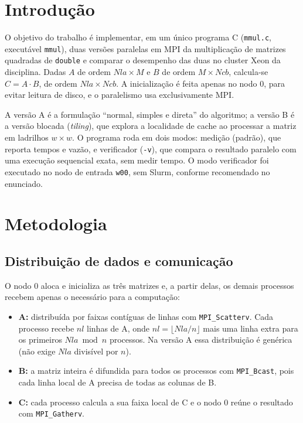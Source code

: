 \documentclass[conference]{IEEEtran}
\begin{document}
\section{Introdução}

O objetivo do trabalho é implementar, em um único programa C (\texttt{mmul.c},
executável \texttt{mmul}), duas versões paralelas em MPI da multiplicação de
matrizes quadradas de \texttt{double} e comparar o desempenho das duas no
cluster Xeon da disciplina. Dadas $A$ de ordem $Nla \times M$ e $B$ de ordem
$M \times Ncb$, calcula-se $C = A \cdot B$, de ordem $Nla \times Ncb$. A
inicialização é feita apenas no nodo 0, para evitar leitura de disco, e o
paralelismo usa exclusivamente MPI.

A versão A é a formulação ``normal, simples e direta'' do algoritmo; a versão
B é a versão blocada (\emph{tiling}), que explora a localidade de cache ao
processar a matriz em ladrilhos $w \times w$. O programa roda em dois modos:
medição (padrão), que reporta tempos e vazão, e verificador (\texttt{-v}), que
compara o resultado paralelo com uma execução sequencial exata, sem medir
tempo. O modo verificador foi executado no nodo de entrada \texttt{w00}, sem
Slurm, conforme recomendado no enunciado.

\section{Metodologia}

\subsection{Distribuição de dados e comunicação}

O nodo 0 aloca e inicializa as três matrizes e, a partir delas, os demais
processos recebem apenas o necessário para a computação:

\begin{itemize}
    \item \textbf{A:} distribuída por faixas contíguas de linhas com
    \texttt{MPI\_Scatterv}. Cada processo recebe $nl$ linhas de A, onde
    $nl = \lfloor Nla/n \rfloor$ mais uma linha extra para os primeiros
    $Nla \bmod n$ processos. Na versão A essa distribuição é genérica
    (não exige $Nla$ divisível por $n$).
    \item \textbf{B:} a matriz inteira é difundida para todos os processos
    com \texttt{MPI\_Bcast}, pois cada linha local de A precisa de todas as
    colunas de B.
    \item \textbf{C:} cada processo calcula a sua faixa local de C e o nodo 0
    reúne o resultado com \texttt{MPI\_Gatherv}.
\end{itemize}
\end{document}
